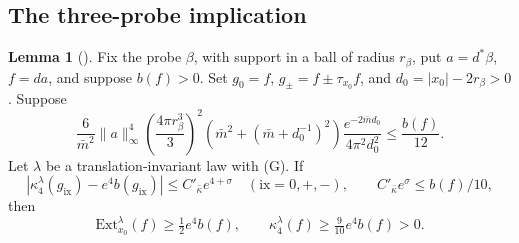 \documentclass[11pt,letterpaper,reqno]{amsart}
\theoremstyle{definition}
\newtheorem{qcmlemma}[qcmproposition]{Lemma}
\newenvironment{lemma}[1][]{\pushQED{\qed}\renewcommand{\qedsymbol}{$\blacksquare$}\begin{qcmlemma}[#1]}{\popQED\end{qcmlemma}}
\begin{document}
\subsection{The three-probe implication}
\label{qcm:three-probe-proof}

\begin{lemma}\label{qcm:three-probes}
Fix the probe $\beta$, with support in a ball of radius $r_\beta$,
put $a=d^*\beta$, $f=da$, and suppose $b(f)>0$. Set
$g_0=f$, $g_\pm=f\pm\tau_{x_0}f$, and
$d_0=|x_0|-2r_\beta>0$. Suppose
\begin{equation}\label{eq:qcm-probe-separation}
 \frac6{\bar m^2}\|a\|_\infty^4
 \left(\frac{4\pi r_\beta^3}{3}\right)^2
 \left(\bar m^2+(\bar m+d_0^{-1})^2\right)
 \frac{e^{-2\bar m d_0}}{4\pi^2d_0^2}
 \le\frac{b(f)}{12}.
\end{equation}
Let $\lambda$ be a translation-invariant law with (G). If
\[
 |\kappa_4^\lambda(g_{\mathrm{ix}})-e^4b(g_{\mathrm{ix}})|
 \le C'_{\bar\kappa}e^{4+\sigma}
 \quad(\mathrm{ix}=0,+,-),\qquad
 C'_{\bar\kappa}e^\sigma\le b(f)/10,
\]
then
\[
 \mathrm{Ext}_{x_0}^\lambda(f)\ge\tfrac12e^4b(f),
 \qquad \kappa_4^\lambda(f)\ge\tfrac9{10}e^4b(f)>0.
\]
\end{lemma}
\end{document}
